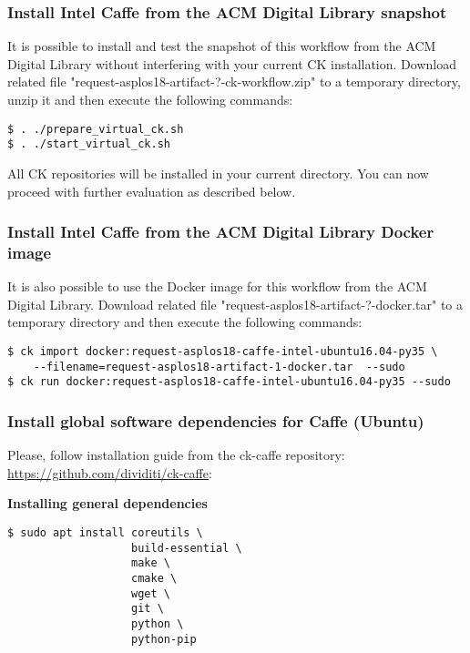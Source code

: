 \documentclass[sigplan]{acmart}
\begin{document}
\subsubsection{Install Intel Caffe from the ACM Digital Library snapshot}

It is possible to install and test the snapshot of this workflow 
from the ACM Digital Library without interfering with your current CK installation.
Download related file "request-asplos18-artifact-?-ck-workflow.zip"
to a temporary directory, unzip it and then execute the following commands:

\begin{verbatim}
$ . ./prepare_virtual_ck.sh
$ . ./start_virtual_ck.sh
\end{verbatim}

All CK repositories will be installed in your current directory.
You can now proceed with further evaluation as described below.

\subsubsection{Install Intel Caffe from the ACM Digital Library Docker image}

It is also possible to use the Docker image for this workflow 
from the ACM Digital Library. Download related file "request-asplos18-artifact-?-docker.tar"
to a temporary directory and then execute the following commands:

\begin{verbatim}
$ ck import docker:request-asplos18-caffe-intel-ubuntu16.04-py35 \
    --filename=request-asplos18-artifact-1-docker.tar  --sudo
$ ck run docker:request-asplos18-caffe-intel-ubuntu16.04-py35 --sudo
\end{verbatim}

\subsubsection{Install global software dependencies for Caffe (Ubuntu)}

Please, follow installation guide from the ck-caffe repository: \url{https://github.com/dividiti/ck-caffe}:

\textbf{Installing general dependencies}

\begin{verbatim}
$ sudo apt install coreutils \
                   build-essential \
                   make \
                   cmake \
                   wget \
                   git \
                   python \
                   python-pip
\end{verbatim}
\end{document}
